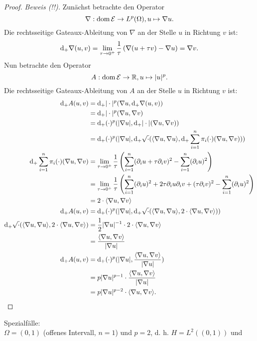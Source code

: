 \begin{beispiel}
\begin{proof}
		\emph{Beweis (!!).} Zunächst betrachte den Operator 
		$$\nabla: \operatorname{dom} \mathcal{E} \to L^p(\Omega), u \mapsto \nabla u.$$
		Die rechtsseitige Gateaux-Ableitung von $\nabla$ an der Stelle $u$ in Richtung $v$ ist:
		$$ \mathrm{d}_+ \nabla (u, v) = \lim_{\tau \to 0^+} \frac{1}{\tau}\left(\nabla (u + \tau v) - \nabla u\right) = \nabla v. $$
		Nun betrachte den Operator
		$$ A: \operatorname{dom} \mathcal{E} \to \mathbb{R}, u \mapsto |u|^p.$$
		Die rechtsseitige Gateaux-Ableitung von $A$ an der Stelle $u$ in Richtung $v$ ist:
		\begin{align*}
			\mathrm{d}_+A(u,v) &= \mathrm{d}_+|\cdot|^p(\nabla u, \mathrm{d}_+\nabla(u,v))\\
				&= \mathrm{d}_+|\cdot|^p(\nabla u, \nabla v)\\
				&= \mathrm{d}_+(\cdot)^p(|\nabla u|, \mathrm{d}_+|\cdot|(\nabla u, \nabla v))\\
				&= \mathrm{d}_+(\cdot)^p(|\nabla u|, \mathrm{d}_+\sqrt{\cdot}(\langle\nabla u, \nabla u\rangle, \mathrm{d}_+ \sum_{i=1}^n \pi_i(\cdot)(\nabla u, \nabla v)))\\
			\mathrm{d}_+ \sum_{i=1}^n \pi_i(\cdot)(\nabla u, \nabla v) &= \lim_{\tau \to 0^+} \frac{1}{\tau} \left(\sum_{i=1}^n (\partial_i u + \tau \partial_i v)^2 - \sum_{i=1}^n (\partial_i u)^2\right)\\
				&= \lim_{\tau \to 0^+} \frac{1}{\tau} \left(\sum_{i=1}^n (\partial_i u)^2 + 2\tau \partial_i u \partial_i v + (\tau \partial_i v)^2 - \sum_{i=1}^n (\partial_i u)^2\right)\\
				&= 2 \cdot \langle\nabla u, \nabla v\rangle\\
			\mathrm{d}_+A(u,v) &= \mathrm{d}_+(\cdot)^p(|\nabla u|, \mathrm{d}_+\sqrt{\cdot}(\langle\nabla u, \nabla u\rangle, 2 \cdot \langle\nabla u, \nabla v\rangle))\\
			\mathrm{d}_+\sqrt{\cdot}(\langle\nabla u, \nabla u\rangle, 2 \cdot \langle\nabla u, \nabla v\rangle) &= \frac{1}{2} |\nabla u|^{-1} \cdot 2 \cdot \langle\nabla u, \nabla v\rangle\\
				&= \frac{\langle\nabla u, \nabla v\rangle}{|\nabla u|}\\
				\mathrm{d}_+A(u,v) &= \mathrm{d}_+(\cdot)^p(|\nabla u|, \frac{\langle\nabla u, \nabla v\rangle}{|\nabla u|})\\
					&= p |\nabla u|^{p-1}\cdot \frac{\langle\nabla u, \nabla v\rangle}{|\nabla u|}\\
					&= p |\nabla u|^{p-2}\cdot \langle\nabla u, \nabla v\rangle.
		\end{align*}
	\end{proof}
	Spezialfälle:\\
	$\Omega=(0,1)$ (offenes Intervall, $n=1$) und $p=2$, d. h. $H=L^2((0,1))$ und 

\end{beispiel}
